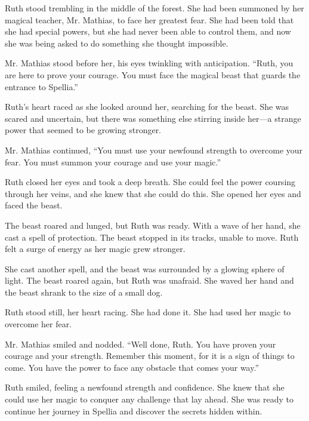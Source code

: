 

Ruth stood trembling in the middle of the forest. She had been summoned by her magical teacher, Mr. Mathias, to face her greatest fear. She had been told that she had special powers, but she had never been able to control them, and now she was being asked to do something she thought impossible.

Mr. Mathias stood before her, his eyes twinkling with anticipation. “Ruth, you are here to prove your courage. You must face the magical beast that guards the entrance to Spellia.”

Ruth’s heart raced as she looked around her, searching for the beast. She was scared and uncertain, but there was something else stirring inside her—a strange power that seemed to be growing stronger.

Mr. Mathias continued, “You must use your newfound strength to overcome your fear. You must summon your courage and use your magic.”

Ruth closed her eyes and took a deep breath. She could feel the power coursing through her veins, and she knew that she could do this. She opened her eyes and faced the beast.

The beast roared and lunged, but Ruth was ready. With a wave of her hand, she cast a spell of protection. The beast stopped in its tracks, unable to move. Ruth felt a surge of energy as her magic grew stronger.

She cast another spell, and the beast was surrounded by a glowing sphere of light. The beast roared again, but Ruth was unafraid. She waved her hand and the beast shrank to the size of a small dog.

Ruth stood still, her heart racing. She had done it. She had used her magic to overcome her fear.

Mr. Mathias smiled and nodded. “Well done, Ruth. You have proven your courage and your strength. Remember this moment, for it is a sign of things to come. You have the power to face any obstacle that comes your way.”

Ruth smiled, feeling a newfound strength and confidence. She knew that she could use her magic to conquer any challenge that lay ahead. She was ready to continue her journey in Spellia and discover the secrets hidden within.